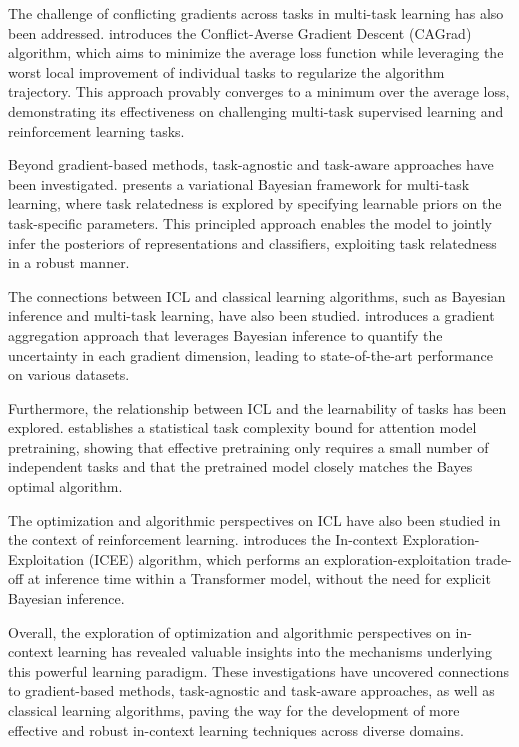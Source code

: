 \documentclass[11pt]{article}
\begin{document}
The challenge of conflicting gradients across tasks in multi-task learning has also been addressed. \cite{ref43} introduces the Conflict-Averse Gradient Descent (CAGrad) algorithm, which aims to minimize the average loss function while leveraging the worst local improvement of individual tasks to regularize the algorithm trajectory. This approach provably converges to a minimum over the average loss, demonstrating its effectiveness on challenging multi-task supervised learning and reinforcement learning tasks.

Beyond gradient-based methods, task-agnostic and task-aware approaches have been investigated. \cite{ref44} presents a variational Bayesian framework for multi-task learning, where task relatedness is explored by specifying learnable priors on the task-specific parameters. This principled approach enables the model to jointly infer the posteriors of representations and classifiers, exploiting task relatedness in a robust manner.

The connections between ICL and classical learning algorithms, such as Bayesian inference and multi-task learning, have also been studied. \cite{ref45} introduces a gradient aggregation approach that leverages Bayesian inference to quantify the uncertainty in each gradient dimension, leading to state-of-the-art performance on various datasets.

Furthermore, the relationship between ICL and the learnability of tasks has been explored. \cite{ref46} establishes a statistical task complexity bound for attention model pretraining, showing that effective pretraining only requires a small number of independent tasks and that the pretrained model closely matches the Bayes optimal algorithm.

The optimization and algorithmic perspectives on ICL have also been studied in the context of reinforcement learning. \cite{ref47} introduces the In-context Exploration-Exploitation (ICEE) algorithm, which performs an exploration-exploitation trade-off at inference time within a Transformer model, without the need for explicit Bayesian inference.

Overall, the exploration of optimization and algorithmic perspectives on in-context learning has revealed valuable insights into the mechanisms underlying this powerful learning paradigm. These investigations have uncovered connections to gradient-based methods, task-agnostic and task-aware approaches, as well as classical learning algorithms, paving the way for the development of more effective and robust in-context learning techniques across diverse domains.
\end{document}
